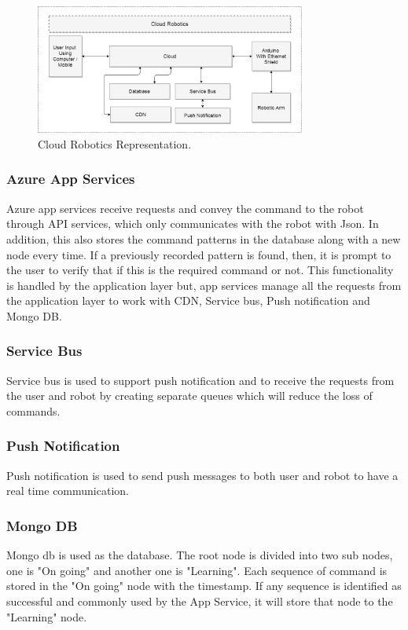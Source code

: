 \documentclass[conference]{IEEEtran}
\begin{document}
\begin{figure}[ht!] %
 \centering
 \includegraphics[width=3.5in]{b.png}
 \caption{Cloud Robotics Representation.}
 \label{cloudRoboticsRepresentation}
 \end{figure}
 
\subsubsection{Azure App Services}
Azure app services receive requests and convey the command to the robot through API services, which only communicates with the robot with Json. In addition, this also stores the command patterns in the database along with a new node every time. If a previously recorded pattern is found, then, it is prompt to the user to verify that if this is the required command or not. This functionality is handled by the application layer but, app services manage all the requests from the application layer to work with CDN, Service bus, Push notification and Mongo DB. 
\subsubsection{Service Bus}
Service bus is used to support push notification and to receive the requests from the user and robot by creating separate queues which will reduce the loss of commands. 
\subsubsection{Push Notification}
Push notification is used to send push messages to both user and robot to have a real time communication. 
\subsubsection{Mongo DB}
Mongo db is used as the database. The root node is divided into two sub nodes, one is "On going" and another one is "Learning". Each sequence of command is stored in the "On going" node with the timestamp. If any sequence is identified as successful and commonly used by the App Service, it will store that node to the "Learning" node. 
\end{document}
